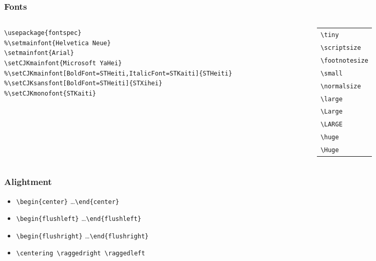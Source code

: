 \documentclass[aspectratio=169,utf8]{ctexbeamer}
\begin{document}
\begin{frame}[fragile]
  \frametitle{Fonts}
  \begin{columns}[t]
    \begin{column}{.65\textwidth}
      \scriptsize
\begin{verbatim}
\usepackage{fontspec}
%\setmainfont{Helvetica Neue}
\setmainfont{Arial}
\setCJKmainfont{Microsoft YaHei}
%\setCJKmainfont[BoldFont=STHeiti,ItalicFont=STKaiti]{STHeiti}
%\setCJKsansfont[BoldFont=STHeiti]{STXihei}
%\setCJKmonofont{STKaiti}
\end{verbatim}
    \end{column}
    \begin{column}{.35\textwidth}

      \begin{tabularx}{\textwidth}{l}
        \tiny{\verb|\tiny|}\\
        \scriptsize{\verb|\scriptsize|}\\
        \footnotesize{\verb|\footnotesize|}\\
        \small{\verb|\small|}\\
        \normalsize{\verb|\normalsize|}\\
        \large{\verb|\large|}\\
        \Large{\verb|\Large|}\\
        \LARGE{\verb|\LARGE|}\\
        \huge{\verb|\huge|}\\
        \Huge{\verb|\Huge|}
      \end{tabularx}

    \end{column}      
  \end{columns}

\end{frame}


\begin{frame}[fragile]
  \frametitle{Alightment}

  \begin{itemize}
    \setlength{\itemsep}{8pt}
    \item \verb|\begin{center}| \ldots \verb|\end{center}|
    \item \verb|\begin{flushleft}| \ldots \verb|\end{flushleft}|
    \item \verb|\begin{flushright}| \ldots \verb|\end{flushright}|
    \item \verb|\centering \raggedright \raggedleft|
  \end{itemize}

\end{frame}
\end{document}
